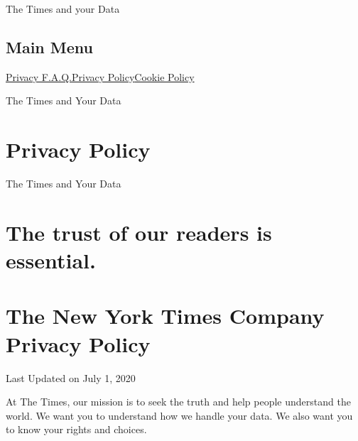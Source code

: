 The Times and your Data

\hypertarget{main-menu}{%
\subsection{Main Menu}\label{main-menu}}

\href{/privacy}{Privacy F.A.Q.}\href{/privacy/privacy-policy}{Privacy
Policy}\href{/privacy/cookie-policy}{Cookie Policy}

The Times and Your Data

\hypertarget{privacy-policy}{%
\section{Privacy Policy}\label{privacy-policy}}

The Times and Your Data

\hypertarget{the-trust-of-our-readers-is-essential}{%
\section{The trust of our readers is
essential.}\label{the-trust-of-our-readers-is-essential}}

\hypertarget{the-new-york-times-company-privacy-policy}{%
\section{The New York Times Company Privacy
Policy}\label{the-new-york-times-company-privacy-policy}}

Last Updated on July 1, 2020

At The Times, our mission is to seek the truth and help people
understand the world. We want you to understand how we handle your data.
We also want you to know your rights and choices.

